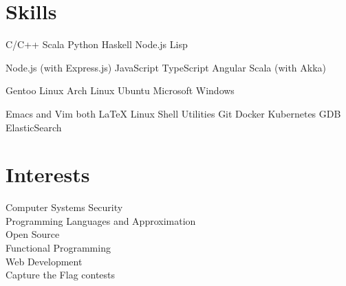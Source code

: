 \documentclass[a4paper]{deedy-resume} %
\begin{document}
\begin{minipage}[t]{0.33\textwidth}
  \sectionspace

  \section{Skills}

  \runsubsection{}
  C/C++ \textbullet{} Scala \textbullet{} Python \textbullet{} Haskell
  \textbullet{} Node.js \textbullet{} Lisp

  \sectionspace
  \sectionspace

  Node.js (with Express.js) \textbullet{} JavaScript \textbullet{} TypeScript
  \textbullet{} Angular \textbullet Scala (with Akka) \\

  \sectionspace
  \sectionspace

  Gentoo Linux \textbullet{} Arch Linux \textbullet{} Ubuntu \textbullet{}
  Microsoft Windows

  \sectionspace
  \sectionspace

  Emacs and Vim both \textbullet{} LaTeX \textbullet{} Linux Shell
  Utilities \textbullet{} Git \textbullet{} Docker \textbullet{}
  Kubernetes \textbullet{} GDB \textbullet ElasticSearch

  \sectionspace
  \sectionspace

  \section{Interests}
  Computer Systems Security\\
  Programming Languages and Approximation\\
  Open Source\\
  Functional Programming\\
  Web Development\\
  Capture the Flag contests

\end{minipage}
\hfill
\end{document}

